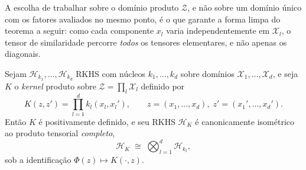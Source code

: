 A escolha de trabalhar sobre o domínio produto $\mathcal{Z}$, e não sobre um domínio único com os fatores avaliados no mesmo ponto, é o que garante a forma limpa do teorema a seguir: como cada componente $x_l$ varia independentemente em $\mathcal{X}_l$, o tensor de similaridade percorre \emph{todos} os tensores elementares, e não apenas os diagonais.

 
\begin{theorem}\label{thm:tensor_similarity}
Sejam $\mathcal{H}_{k_1}, \dots, \mathcal{H}_{k_d}$ RKHS com núcleos $k_1, \dots, k_d$ sobre domínios $\mathcal{X}_1, \dots, \mathcal{X}_d$, e seja $K$ o \textit{kernel} produto sobre $\mathcal{Z} = \prod_l \mathcal{X}_l$ definido por
\begin{equation}\label{eq:K_thm}
    K(z, z') = \prod_{l=1}^{d} k_l(x_l, x_l'), \qquad z = (x_1,\dots,x_d), \; z' = (x_1',\dots,x_d').
\end{equation}
Então $K$ é positivamente definido, e seu RKHS $\mathcal{H}_K$ é canonicamente isométrico ao produto tensorial \emph{completo},
\begin{equation}\label{eq:full_iso}
    \mathcal{H}_K \;\cong\; \bigotimes_{l=1}^{d} \mathcal{H}_{k_l},
\end{equation}
sob a identificação $\Phi(z) \mapsto K(\cdot, z)$.
\end{theorem}
 
